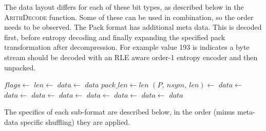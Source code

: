 \documentclass[a4paper]{article}
\begin{document}
The data layout differs for each of these bit types, as described below in the \textsc{ArithDecode} function.
Some of these can be used in combination, so the order needs to be observed.
The Pack format has additional meta data.
This is decoded first, before entropy decoding and finally expanding the specified pack transformation after decompression.
For example value 193 is indicates a byte stream should be decoded with an RLE aware order-1 entropy encoder and then unpacked.

\begin{algorithmic}[1]
  \State $flags \gets $
    \State $len \gets$
  \EndIf
    \State $data \gets $
    \State \Return $data$
  \EndIf{}
    \State $pack\_len \gets len$
    \State $(P,\ nsym,\ len) \gets $
  \EndIf
  \Statex {}
    \State $data \gets $
    \State $data \gets $
      \State $data \gets $
    \Else
      \State $data \gets $
    \EndIf
  \Else
      \State $data \gets $
    \Else
      \State $data \gets $
    \EndIf
  \EndIf
  \Statex {}
    \State $data \gets $
  \EndIf
  \State \Return $data$
  \EndFunction
\end{algorithmic}

The specifics of each sub-format are described below, in the order (minus meta-data specific shuffling) they are applied.
\end{document}
